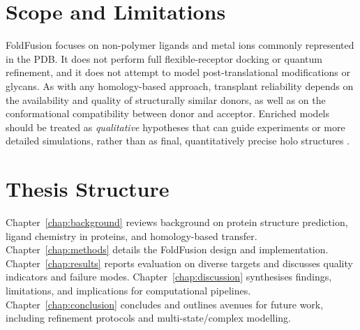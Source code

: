 \section{Scope and Limitations}
FoldFusion focuses on non-polymer ligands and metal ions commonly represented in the PDB. It does not perform full flexible-receptor docking or quantum refinement, and it does not attempt to model post-translational modifications or glycans. As with any homology-based approach, transplant reliability depends on the availability and quality of structurally similar donors, as well as on the conformational compatibility between donor and acceptor. Enriched models should be treated as \emph{qualitative} hypotheses that can guide experiments or more detailed simulations, rather than as final, quantitatively precise holo structures \cite{hekkelmanAlphaFillEnrichingAlphaFold2023}.

\section{Thesis Structure}
Chapter~\ref{chap:background} reviews background on protein structure prediction, ligand chemistry in proteins, and homology-based transfer. Chapter~\ref{chap:methods} details the FoldFusion design and implementation. Chapter~\ref{chap:results} reports evaluation on diverse targets and discusses quality indicators and failure modes. Chapter~\ref{chap:discussion} synthesises findings, limitations, and implications for computational pipelines. Chapter~\ref{chap:conclusion} concludes and outlines avenues for future work, including refinement protocols and multi-state/complex modelling.
